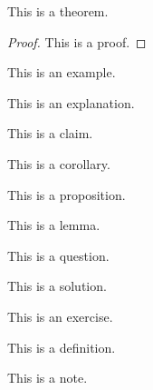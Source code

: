 \begin{theorem}
This is a theorem.
\end{theorem}
\begin{proof}
This is a proof.
\end{proof}
\begin{example}
This is an example.
\end{example}
\begin{explanation}
This is an explanation.
\end{explanation}
\begin{claim}
This is a claim.
\end{claim}
\begin{corollary}
This is a corollary.
\end{corollary}
\begin{prop}
This is a proposition.
\end{prop}
\begin{lemma}
This is a lemma.
\end{lemma}
\begin{question}
This is a question.
\end{question}
\begin{solution}
This is a solution.
\end{solution}
\begin{exercise}
This is an exercise.
\end{exercise}
\begin{definition}[Definition]
This is a definition.
\end{definition}
\begin{note}
This is a note.
\end{note}


\newpage
